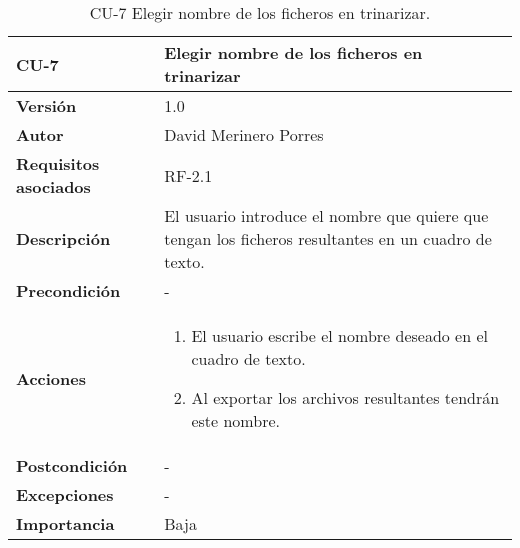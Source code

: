 \begin{table}[p]
	\centering
	\begin{tabularx}{\linewidth}{ p{} p{} }
		\toprule
		\textbf{CU-7}    & \textbf{Elegir nombre de los ficheros en trinarizar}\\
		\toprule
		\textbf{Versión}              & 1.0    \\
		\textbf{Autor}                & David Merinero Porres \\
		\textbf{Requisitos asociados} & RF-2.1 \\
		\textbf{Descripción}          & El usuario introduce el nombre que quiere que tengan los ficheros resultantes en un cuadro de texto. \\
		\textbf{Precondición}         & - \\
		\textbf{Acciones}             &
		\begin{enumerate}
			\def\labelenumi{\arabic{enumi}.}
			\tightlist
			\item El usuario escribe el nombre deseado en el cuadro de texto.
			\item Al exportar los archivos resultantes tendrán este nombre.
		\end{enumerate}\\
		\textbf{Postcondición}        & - \\
		\textbf{Excepciones}          & - \\
		\textbf{Importancia}          & Baja \\
		\bottomrule
	\end{tabularx}
	\caption{CU-7 Elegir nombre de los ficheros en trinarizar.}
\end{table}

